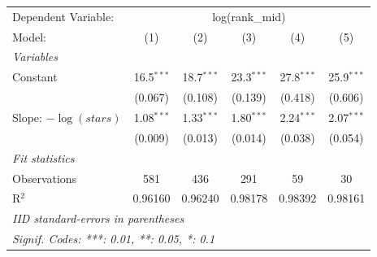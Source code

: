 
\begingroup
\centering
\begin{tabular}{lccccc}
   \tabularnewline \midrule \midrule
   Dependent Variable: & \multicolumn{5}{c}{log(rank\_mid)}\\
   Model:                 & (1)          & (2)          & (3)          & (4)          & (5)\\  
   \midrule
   \emph{Variables}\\
   Constant               & 16.5$^{***}$ & 18.7$^{***}$ & 23.3$^{***}$ & 27.8$^{***}$ & 25.9$^{***}$\\   
                          & (0.067)      & (0.108)      & (0.139)      & (0.418)      & (0.606)\\   
   Slope: $-\log(stars)$  & 1.08$^{***}$ & 1.33$^{***}$ & 1.80$^{***}$ & 2.24$^{***}$ & 2.07$^{***}$\\   
                          & (0.009)      & (0.013)      & (0.014)      & (0.038)      & (0.054)\\   
   \midrule
   \emph{Fit statistics}\\
   Observations           & 581          & 436          & 291          & 59           & 30\\  
   R$^2$                  & 0.96160      & 0.96240      & 0.98178      & 0.98392      & 0.98161\\  
   \midrule \midrule
   \multicolumn{6}{l}{\emph{IID standard-errors in parentheses}}\\
   \multicolumn{6}{l}{\emph{Signif. Codes: ***: 0.01, **: 0.05, *: 0.1}}\\
\end{tabular}
\par\endgroup


